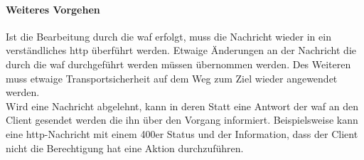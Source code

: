 \paragraph{Weiteres Vorgehen}
Ist die Bearbeitung durch die \ac{waf} erfolgt, muss die Nachricht wieder in ein verständliches \ac{http} überführt werden.
Etwaige Änderungen an der Nachricht die durch die \ac{waf} durchgeführt werden müssen übernommen werden.
Des Weiteren muss etwaige Transportsicherheit auf dem Weg zum Ziel wieder angewendet werden.\\

Wird eine Nachricht abgelehnt, kann in deren Statt eine Antwort der \ac{waf} an den Client gesendet werden die ihn über den Vorgang informiert.
Beispielsweise kann eine \ac{http}-Nachricht mit einem 400er Status und der Information, dass der Client nicht die Berechtigung hat eine Aktion durchzuführen.



